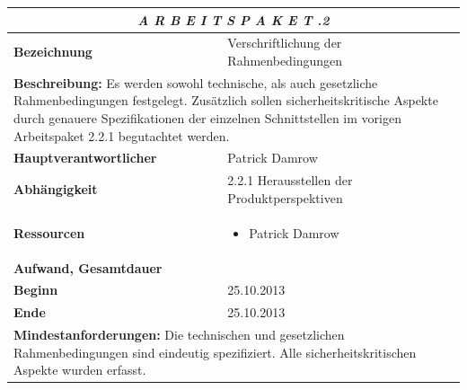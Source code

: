 \documentclass[fontsize=12pt,paper=a4,twoside]{scrartcl}
\begin{document}
\begin{tabular}{p{7.5cm}|p{7.5cm}}\toprule
\multicolumn{2}{c}{\textbf{\textit{A R B E I T S P A K E T \quad 2.2.2}}} \\ \toprule \hline
\textbf{Bezeichnung} & Verschriftlichung der Rahmenbedingungen\\\hline
\multicolumn{2}{p{15cm}}{\textbf{Beschreibung:} \newline 
Es werden sowohl technische, als auch gesetzliche Rahmenbedingungen festgelegt. Zusätzlich sollen 
sicherheitskritische Aspekte durch genauere Spezifikationen der einzelnen Schnittstellen im vorigen Arbeitspaket 2.2.1
begutachtet werden. }  \\\hline
\textbf{Hauptverantwortlicher} & Patrick Damrow \\\hline
\textbf{Abhängigkeit} & 2.2.1 Herausstellen der Produktperspektiven \\\hline
\textbf{Ressourcen} & \begin{itemize} 
\itemsep0pt
\item Patrick Damrow
\end{itemize} \\\hline
\textbf{Aufwand, Gesamtdauer} & \\\hline
\textbf{Beginn} & 25.10.2013 \\\hline
\textbf{Ende} & 25.10.2013\\\hline
\multicolumn{2}{p{15cm}}{\textbf{Mindestanforderungen: } \newline
Die technischen und gesetzlichen Rahmenbedingungen sind eindeutig spezifiziert. Alle sicherheitskritischen Aspekte
wurden erfasst. }  \\ \toprule
\end{tabular} \\\\
\end{document}
